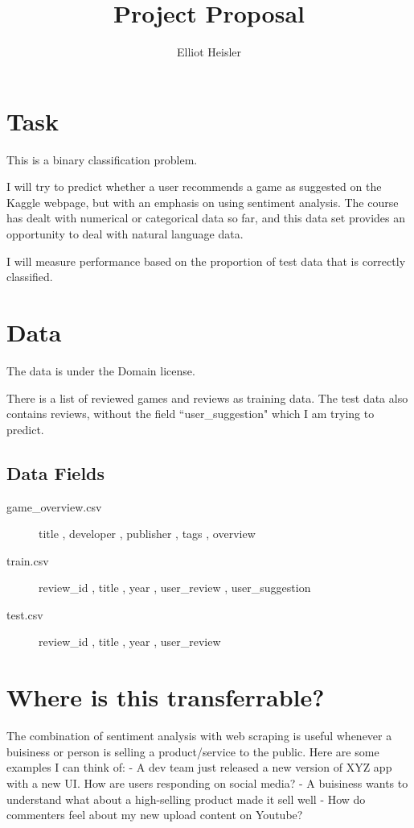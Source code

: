 \documentclass[acmtog]{acmart}
\author{Elliot Heisler}
\title{Project Proposal}
\begin{document}
\maketitle


\section{Task}

This is a binary classification problem.

I will try to predict whether a user recommends a game as suggested on the Kaggle webpage, but with an emphasis on using sentiment analysis. The course has dealt with numerical
or categorical data so far, and this data set provides an opportunity to deal with
natural language data.

I will measure performance based on the proportion of test data that is correctly
classified.


\section{Data}
The data is under the  Domain license.

There is a list of reviewed games and reviews as training data. The test data
also contains reviews, without the field ``user\_suggestion" which I am trying to predict.

\subsection{Data Fields}
\begin{description}
\item[game\_overview.csv] title , developer , publisher , tags , overview 
\item[train.csv] review\_id , title , year , user\_review , user\_suggestion 
\item[test.csv] review\_id , title , year , user\_review
\end{description}


\section{Where is this transferrable?}
The combination of sentiment analysis with web scraping is useful whenever a buisiness or person is selling a product/service to the public. Here are some examples I can think of:
- A dev team just released a new version of XYZ app with a new UI. How are users responding on social media?
- A buisiness wants to understand what about a high-selling product made it sell well
- How do commenters feel about my new upload content on Youtube?
\end{document}

